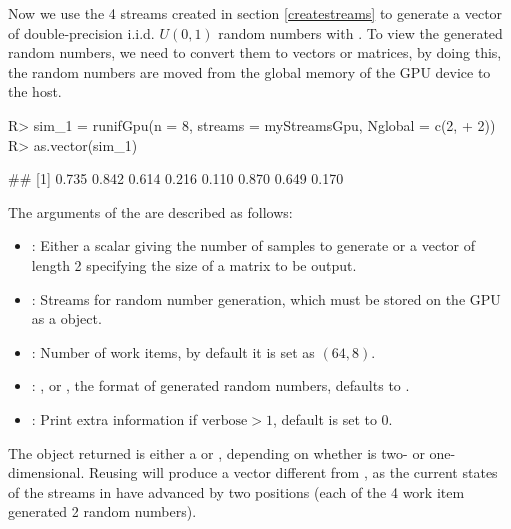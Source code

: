 \documentclass[article,nojss]{jss}\usepackage[]{graphicx}\usepackage[]{color}
\newcommand{\fct}[1]{\code{#1()}}
\begin{document}
Now we use the 4 streams created in section \ref{createstreams} to generate a vector of double-precision i.i.d. $U(0,1)$ random numbers with \fct{runifGpu}. To view the generated random numbers, we need to convert them to  vectors or matrices, by doing this, the random numbers are moved from the global memory of the GPU device to the host.
\begin{CodeChunk}
\begin{CodeInput}
R> sim_1 = runifGpu(n = 8, streams = myStreamsGpu, Nglobal = c(2,
+    2))
R> as.vector(sim_1)
\end{CodeInput}
\begin{CodeOutput}
## [1] 0.735 0.842 0.614 0.216 0.110 0.870 0.649 0.170
\end{CodeOutput} 
\end{CodeChunk} 

The arguments of the \fct{runifGpu} are described as follows:
\begin{itemize}
\itemsep0em 
  \item {}: Either a scalar giving the number of samples to generate or a vector of length 2 specifying the size of a matrix to be output.
  \item {}: Streams for random number generation, which must be stored on the GPU as a  object.
  \item {}: Number of work items, by default it is set as $(64,8)$.
  \item {}: ,  or , the format of generated random numbers, defaults to .
  \item {}: Print extra information if $\text{verbose} > 1$, default is set to 0.
\end{itemize}

The object returned is either a  or , depending on whether  is two- or one-dimensional.  Reusing  will produce a vector different from , as the current states of the streams in  have advanced by two positions (each of the 4 work item generated 2 random numbers).  
\end{document}
